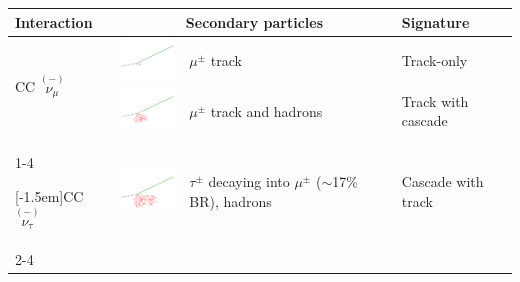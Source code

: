 \begin{table}[h]
    \small
    \begin{center}
        \begin{tabular}{ m{1.8cm} m{2.0cm} m{3.0cm} m{1.8cm} }

            \hline\hline

            \textbf{Interaction} & \multicolumn{2}{c}{\textbf{Secondary particles}} &\textbf{Signature} \\

            \hline\hline

            \multirow{2}{*}[-1.5em]{CC $\overset{(-)}{\nu_\mu}$ }
            & \includegraphics[width=2cm]{figures/neutrinos_properties/interaction_schematics/numu_CC_muon_only.pdf} 
            & $\mu^\pm$ track 
            & Track-only \\

            \cmidrule{2-4} 
            &\includegraphics[width=2cm]{figures/neutrinos_properties/interaction_schematics/numu_CC_track_cascade.pdf}  
            & $\mu^\pm$ track and hadrons 
            & Track with cascade \\


            \cmidrule{1-4}

            \multirow{2}{*}[-1.5em]{CC $\overset{(-)}{\nu_\tau}$ }
            &\includegraphics[width=2cm]{figures/neutrinos_properties/interaction_schematics/nutau_CC_track_cascade.pdf} 
            & $\tau^\pm$ decaying into $\mu^\pm$ ($\sim$17\% BR), hadrons 
            & Cascade with track \\

            \cmidrule{2-4}


\end{tabular}
\end{center}
\end{table}
